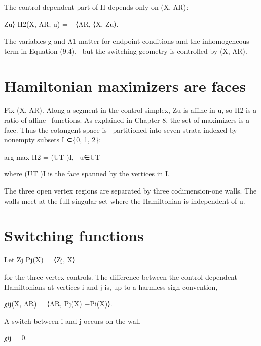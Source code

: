 The control-dependent part of H depends only on (X, ΛR):


\begin{displaytext}
Zu⟩ H2(X, ΛR; u) = −⟨ΛR, ⟨X, Zu⟩.
\end{displaytext}

\begin{displaytext}
The variables g and Λ1 matter for endpoint conditions and the inhomogeneous term in Equation (9.4), \
but the switching geometry is controlled by (X, ΛR).
\end{displaytext}

\section{Hamiltonian maximizers are faces}

\begin{displaytext}
Fix (X, ΛR). Along a segment in the control simplex, Zu is affine in u, so H2 is a ratio of affine \
functions. As explained in Chapter 8, the set of maximizers is a face. Thus the cotangent space is \
partitioned into seven strata indexed by nonempty subsets I ⊂\{0, 1, 2\}:
\end{displaytext}

\begin{displaytext}
arg max H2 = (UT )I, \
u∈UT
\end{displaytext}

where (UT )I is the face spanned by the vertices in I.


The three open vertex regions are separated by three codimension-one walls. The walls meet at the full singular set where the Hamiltonian is independent of u.


\section{Switching functions}

Let Zj Pj(X) = ⟨Zj, X⟩


for the three vertex controls. The difference between the control-dependent Hamiltonians at vertices i and j is, up to a harmless sign convention,


\begin{displaytext}
χij(X, ΛR) = ⟨ΛR, Pj(X) −Pi(X)⟩.
\end{displaytext}

A switch between i and j occurs on the wall


\begin{displaytext}
χij = 0.
\end{displaytext}

